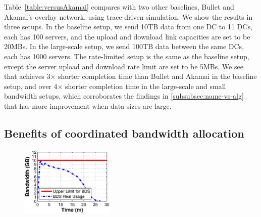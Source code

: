 
Table~\ref{table:versusAkamai} compares \name with two other 
baselines, Bullet and Akamai's overlay network, using trace-driven
simulation. We show the results in three setups. In the baseline setup, 
we send 10TB data from one DC to 11 DCs, each has 100 servers, and 
the upload and download link capacities are set to be 20MBs. In the 
large-scale setup, we send 100TB data between the same DCs, each has 
1000 servers. The rate-limited setup is the same as the baseline setup, 
except the server upload and download rate limit are set to be 5MBs. 
We see that \name achieves 3$\times$ shorter completion time than 
Bullet and Akamai in the baseline setup, and over 4$\times$ shorter 
completion time in the large-scale and small bandwidth setups, which
corroborates the findings in \Section\ref{subsubsec:name-vs-alg} that
\name has more improvement when data sizes are large.

\begin{table}[t]
\begin{center}
\end{center}
\label{table:versusAkamai}
\vspace{-0.4cm}
\end{table}

\subsection{Benefits of coordinated bandwidth allocation}
\label{subsec:evaluation:separation}
\begin{figure}[t]
  \centering
  \includegraphics[width=45mm]{images/Quota_v2.eps}%
  \label{fig:quota}
\vspace{-0.2cm}
\end{figure}

